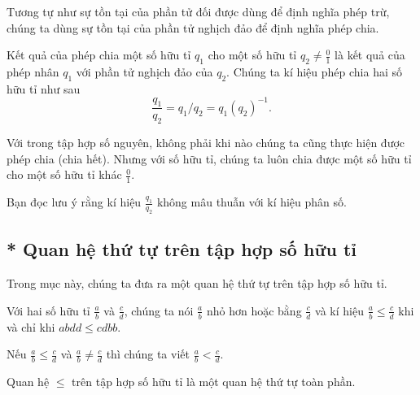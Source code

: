 Tương tự như sự tồn tại của phần tử đối được dùng để định nghĩa phép trừ, chúng ta dùng sự tồn tại của phần tử nghịch đảo để định nghĩa phép chia.
\begin{definition}
    Kết quả của phép chia một số hữu tỉ $q_{1}$ cho một số hữu tỉ $q_{2}\ne\frac{0}{1}$ là kết quả của phép nhân $q_{1}$ với phần tử nghịch đảo của $q_{2}$. Chúng ta kí hiệu phép chia hai số hữu tỉ như sau
    \[
        \frac{q_{1}}{q_{2}} = q_{1}/q_{2} = q_{1}{(q_{2})}^{-1}.
    \]
\end{definition}

Với trong tập hợp số nguyên, không phải khi nào chúng ta cũng thực hiện được phép chia (chia hết). Nhưng với số hữu tỉ, chúng ta luôn chia được một số hữu tỉ cho một số hữu tỉ khác $\frac{0}{1}$.

Bạn đọc lưu ý rằng kí hiệu $\frac{q_{1}}{q_{2}}$ không mâu thuẫn với kí hiệu phân số.

\subsection{* Quan hệ thứ tự trên tập hợp số hữu tỉ}

Trong mục này, chúng ta đưa ra một quan hệ thứ tự trên tập hợp số hữu tỉ.
\begin{definition}
    Với hai số hữu tỉ $\frac{a}{b}$ và $\frac{c}{d}$, chúng ta nói $\frac{a}{b}$ nhỏ hơn hoặc bằng $\frac{c}{d}$ và kí hiệu $\frac{a}{b}\leq \frac{c}{d}$ khi và chỉ khi $abdd \leq cdbb$.

    Nếu $\frac{a}{b}\leq \frac{c}{d}$ và $\frac{a}{b}\ne\frac{c}{d}$ thì chúng ta viết $\frac{a}{b} < \frac{c}{d}$.
\end{definition}

\begin{theorem}
    Quan hệ $\leq$ trên tập hợp số hữu tỉ là một quan hệ thứ tự toàn phần.
\end{theorem}

